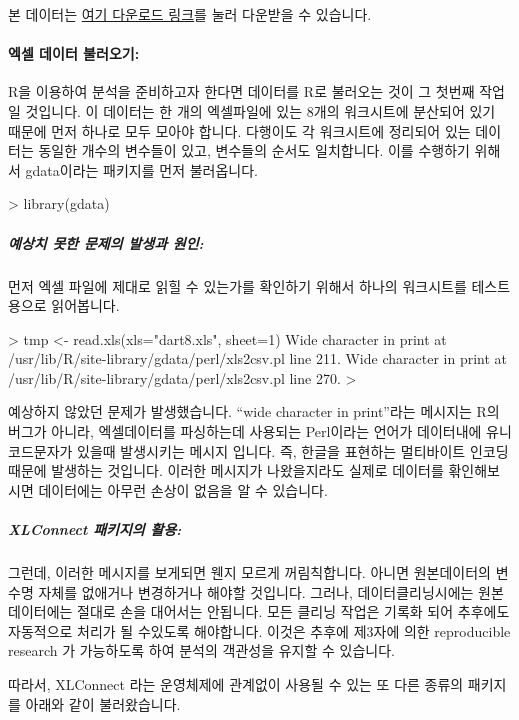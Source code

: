 본 데이터는 \href{http://korea.gnu.org/gnustats/dataset/dart8.xls}{여기 다운로드 링크}를 눌러 다운받을 수 있습니다.

\paragraph{엑셀 데이터 불러오기:}  
R을 이용하여 분석을 준비하고자 한다면 데이터를 R로 불러오는 것이 그 첫번째 작업일 것입니다.
이 데이터는 한 개의 엑셀파일에 있는 8개의 워크시트에 분산되어 있기 때문에 먼저 하나로 모두 모아야 합니다.
다행이도 각 워크시트에 정리되어 있는 데이터는 동일한 개수의 변수들이 있고, 변수들의 순서도 일치합니다.
이를 수행하기 위해서 gdata이라는 패키지를 먼저 불러옵니다.

\begin{Schunk}
\begin{Soutput}
> library(gdata)
\end{Soutput}
\end{Schunk}

\subparagraph{예상치 못한 문제의 발생과 원인:} 
먼저 엑셀 파일에 제대로 읽힐 수 있는가를 확인하기 위해서 하나의 워크시트를 테스트용으로 읽어봅니다.

\begin{Schunk}
\begin{Soutput}
> tmp <- read.xls(xls="dart8.xls", sheet=1)
Wide character in print at /usr/lib/R/site-library/gdata/perl/xls2csv.pl line 211.
Wide character in print at /usr/lib/R/site-library/gdata/perl/xls2csv.pl line 270.
> 
\end{Soutput}
\end{Schunk}

예상하지 않았던 문제가 발생했습니다. 
``wide character in print''라는 메시지는 R의 버그가 아니라, 엑셀데이터를 파싱하는데 사용되는 Perl이라는  언어가 데이터내에 유니코드문자가 있을때 발생시키는 메시지 입니다.
즉, 한글을 표현하는 멀티바이트 인코딩 때문에 발생하는 것입니다.
이러한 메시지가 나왔을지라도 실제로 데이터를 홖인해보시면 데이터에는 아무런 손상이 없음을 알 수 있습니다.

\subparagraph{XLConnect 패키지의 활용:}
그런데, 이러한 메시지를 보게되면 웬지 모르게 꺼림칙합니다. 
아니면 원본데이터의 변수명 자체를 없애거나 변경하거나 해야할 것입니다.
그러나, 데이터클리닝시에는 원본 데이터에는 절대로 손을 대어서는 안됩니다.
모든 클리닝 작업은 기록화 되어 추후에도 자동적으로 처리가 될 수있도록 해야합니다.
이것은 추후에 제3자에 의한 reproducible research 가 가능하도록 하여 분석의 객관성을 유지할 수 있습니다.

따라서, XLConnect 라는 운영체제에 관계없이 사용될 수 있는 또 다른 종류의 패키지를 아래와 같이 불러왔습니다.

